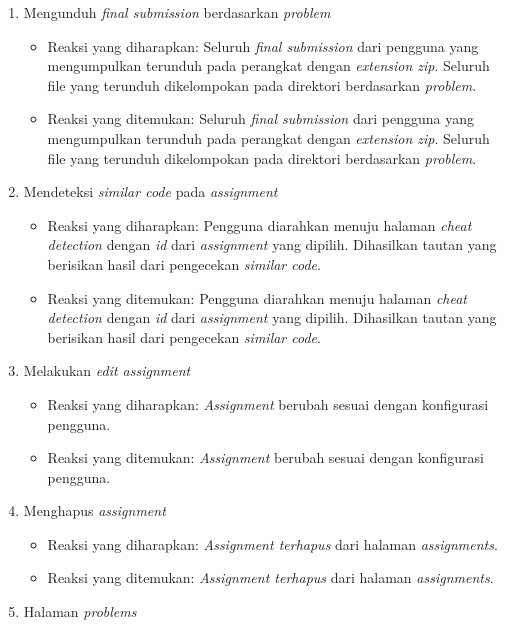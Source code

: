 \begin{enumerate}
\begin{itemize}
	 \end{itemize}
	 \item Mengunduh \textit{final submission} berdasarkan \textit{problem}
	 \begin{itemize}
	 	\item Reaksi yang diharapkan: Seluruh \textit{final submission} dari pengguna yang mengumpulkan terunduh pada perangkat dengan \textit{extension zip}. Seluruh file yang terunduh dikelompokan pada direktori berdasarkan \textit{problem}.
	 	\item Reaksi yang ditemukan: Seluruh \textit{final submission} dari pengguna yang mengumpulkan terunduh pada perangkat dengan \textit{extension zip}. Seluruh file yang terunduh dikelompokan pada direktori berdasarkan \textit{problem}.
	 \end{itemize}
	 \item Mendeteksi \textit{similar code} pada \textit{assignment}
	 \begin{itemize}
	 	\item Reaksi yang diharapkan: Pengguna diarahkan menuju halaman \textit{cheat detection} dengan \textit{id} dari \textit{assignment} yang dipilih. Dihasilkan tautan yang berisikan hasil dari pengecekan \textit{similar code}.
	 	\item Reaksi yang ditemukan: Pengguna diarahkan menuju halaman \textit{cheat detection} dengan \textit{id} dari \textit{assignment} yang dipilih. Dihasilkan tautan yang berisikan hasil dari pengecekan \textit{similar code}.
	 \end{itemize}
	 \item Melakukan \textit{edit assignment}
	 \begin{itemize}
	 	\item Reaksi yang diharapkan: \textit{Assignment} berubah sesuai dengan konfigurasi pengguna.
	 	\item Reaksi yang ditemukan: \textit{Assignment} berubah sesuai dengan konfigurasi pengguna.
	 \end{itemize}
	 \item Menghapus \textit{assignment}
	 \begin{itemize}
	 	\item Reaksi yang diharapkan: \textit{Assignment terhapus} dari halaman \textit{assignments}.
	 	\item Reaksi yang ditemukan: \textit{Assignment terhapus} dari halaman \textit{assignments}.
	 \end{itemize}
	 \item Halaman \textit{problems}

\end{enumerate}
